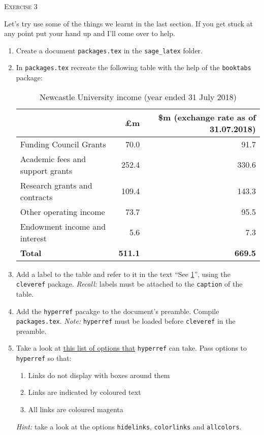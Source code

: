 \documentclass{article}
\begin{document}
\begin{center}
  \Large\textsc{Exercise 3}
\end{center}

\noindent Let's try use some of the things we learnt in the last section. If you
get stuck at any point put your hand up and I'll come over to help.\\

\begin{enumerate}

\item Create a document \texttt{packages.tex} in the \texttt{sage\_latex} folder.

\item{ In \texttt{packages.tex} recreate the following table with the help of
 the \texttt{booktabs} package:

\begin{table}[h]
\begin{tabular}{@{}lrr@{}}
\toprule
& \textbf{£m} & \textbf{\$m (exchange rate as of 31.07.2018)} \\\midrule
Funding Council Grants & 70.0 & 91.7 \\
Academic fees and support grants & 252.4 & 330.6 \\
Research grants and contracts & 109.4 & 143.3\\
Other operating income & 73.7 & 95.5 \\
Endowment income and interest & 5.6 & 7.3\\\midrule
\textbf{Total} & \textbf{511.1} & \textbf{669.5} \\\bottomrule
\end{tabular}
\caption{Newcastle University income (year ended 31 July 2018)}
\label{tab:newcy}
\end{table}
}

\item Add a label to the table and refer to it in the text
 ``See \cref{tab:newcy}'', using the \texttt{cleveref} package. \textsl{Recall:} 
 labels must be attached to the \texttt{caption} of the table.

\item Add the \texttt{hyperref} pacakge to the document's preamble.
Compile \texttt{packages.tex}.
 \textsl{Note:} \texttt{hyperref} must be loaded before \texttt{cleveref} in the
preamble. 
\item Take a look at
 \href{tftp://tug.ctan.org/pub/tex-archive/macros/latex/contrib/hyperref/doc/options.pdf}%
{this list of options that} \texttt{hyperref} can take. Pass options to 
\texttt{hyperref} so that:
\begin{enumerate}
\item Links do not display with boxes around them
\item Links are indicated by coloured text
\item All links are coloured magenta
\end{enumerate}
\textsl{Hint:} take a look at the options \texttt{hidelinks},
 \texttt{colorlinks} and \texttt{allcolors}.

\end{enumerate}
\end{document}
